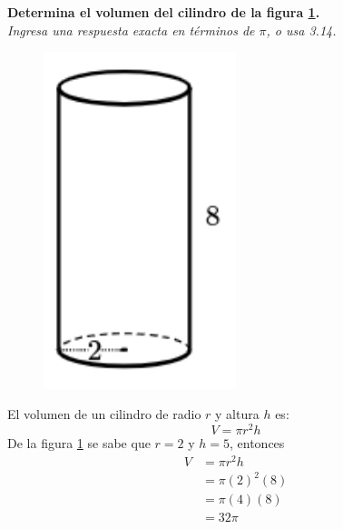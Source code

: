 \question[10] \textbf{Determina el volumen del cilindro de la figura
    \ref{fig:vol_cil_09}.}\\
\textit{Ingresa una respuesta exacta en términos de $\pi$, o usa 3.14.}

\begin{minipage}{0.3\linewidth}
    \begin{figure}[H]
        \begin{center}
            \includegraphics[width=0.5\textwidth]{../images/vol_cil_09.png}
        \end{center}
        \caption{}
        \label{fig:vol_cil_09}
    \end{figure}
\end{minipage}
\begin{minipage}{0.7\linewidth}
    \begin{solutionbox}{6cm}        El volumen de un cilindro de radio $r$ y altura $h$ es:
        \begin{equation*}
            V = \pi r^2 h
        \end{equation*}
        De la figura \ref{fig:vol_cil_09} se sabe que $r=2$ y $h=5$, entonces
        \begin{equation*}
            \begin{split}
                V & = \pi r^2 h\\
                & = \pi (2)^2 (8)\\
                & = \pi (4) (8)\\
                & = 32\pi
            \end{split}
        \end{equation*}
    \end{solutionbox}
\end{minipage}